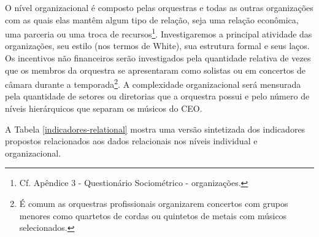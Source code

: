 \documentclass[a4paper, 12pt, openright, oneside, german, french, english, brazil]{abntex2}
\begin{document}
	O nível organizacional é composto pelas orquestras e todas as outras organizações com as quais elas mantêm algum tipo de relação, seja uma relação econômica, uma parceria ou uma troca de recursos\footnote{Cf. Apêndice 3 - Questionário Sociométrico - organizações.}. Investigaremos a principal atividade das organizações, seu estilo (nos termos de White), sua estrutura formal e seus laços. Os incentivos não financeiros serão investigados pela quantidade relativa de vezes que os membros da orquestra se apresentaram como solistas ou em concertos de câmara durante a temporada\footnote{É comum as orquestras profissionais organizarem concertos com grupos menores como quartetos de cordas ou quintetos de metais com músicos selecionados.}. A complexidade organizacional será mensurada pela quantidade de setores ou diretorias que a orquestra possui e pelo número de níveis hierárquicos que separam os músicos do CEO.
	
	
	
	A Tabela \ref{indicadores-relational} mostra uma versão sintetizada dos indicadores propostos relacionados aos dados relacionais nos níveis individual e organizacional.
	
	
\end{document}
